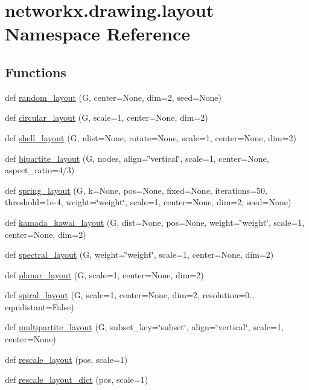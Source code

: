 \hypertarget{namespacenetworkx_1_1drawing_1_1layout}{}\section{networkx.\+drawing.\+layout Namespace Reference}
\label{namespacenetworkx_1_1drawing_1_1layout}
\subsection*{Functions}
\begin{DoxyCompactItemize}
\item 
def \hyperlink{namespacenetworkx_1_1drawing_1_1layout_addafb2807d9e7cb9a5f464ce70bc2e1b}{random\+\_\+layout} (G, center=None, dim=2, seed=None)
\item 
def \hyperlink{namespacenetworkx_1_1drawing_1_1layout_ad5f2fac85819ae55ebd51de00e25bf75}{circular\+\_\+layout} (G, scale=1, center=None, dim=2)
\item 
def \hyperlink{namespacenetworkx_1_1drawing_1_1layout_afda61265a93a6d2ff4f19c624723d387}{shell\+\_\+layout} (G, nlist=None, rotate=None, scale=1, center=None, dim=2)
\item 
def \hyperlink{namespacenetworkx_1_1drawing_1_1layout_a333ec4bb45a6a3490bcd462b06ff025a}{bipartite\+\_\+layout} (G, nodes, align=\char`\"{}vertical\char`\"{}, scale=1, center=None, aspect\+\_\+ratio=4/3)
\item 
def \hyperlink{namespacenetworkx_1_1drawing_1_1layout_a49950bbfa7bf1c305bc9e049459ab7b9}{spring\+\_\+layout} (G, k=None, pos=None, fixed=None, iterations=50, threshold=1e-\/4, weight=\char`\"{}weight\char`\"{}, scale=1, center=\+None, dim=2, seed=\+None)
\item 
def \hyperlink{namespacenetworkx_1_1drawing_1_1layout_a6ab42bac0264130fda591b926dc36600}{kamada\+\_\+kawai\+\_\+layout} (G, dist=None, pos=None, weight=\char`\"{}weight\char`\"{}, scale=1, center=None, dim=2)
\item 
def \hyperlink{namespacenetworkx_1_1drawing_1_1layout_ac947260649039048ed839ba8fcba2428}{spectral\+\_\+layout} (G, weight=\char`\"{}weight\char`\"{}, scale=1, center=None, dim=2)
\item 
def \hyperlink{namespacenetworkx_1_1drawing_1_1layout_aa9e8021cbef52e60e267eed205c99e1f}{planar\+\_\+layout} (G, scale=1, center=None, dim=2)
\item 
def \hyperlink{namespacenetworkx_1_1drawing_1_1layout_a3594891dab725686c99df4708e7d01a7}{spiral\+\_\+layout} (G, scale=1, center=None, dim=2, resolution=0., equidistant=False)
\item 
def \hyperlink{namespacenetworkx_1_1drawing_1_1layout_a3d5aad61461478c634351e735fdb815b}{multipartite\+\_\+layout} (G, subset\+\_\+key=\char`\"{}subset\char`\"{}, align=\char`\"{}vertical\char`\"{}, scale=1, center=None)
\item 
def \hyperlink{namespacenetworkx_1_1drawing_1_1layout_af6ddcb7319b47ee6b98301e3a15be250}{rescale\+\_\+layout} (pos, scale=1)
\item 
def \hyperlink{namespacenetworkx_1_1drawing_1_1layout_a9da50cbee09c4590ddb983e828ee5c91}{rescale\+\_\+layout\+\_\+dict} (pos, scale=1)
\end{DoxyCompactItemize}
